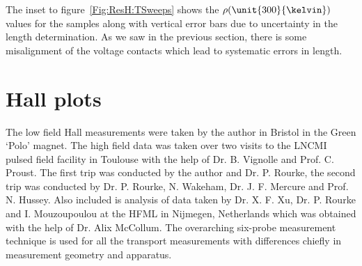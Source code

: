 The inset to figure~\ref{Fig:ResH:TSweeps} shows the $\rho(\unit{300}{\kelvin})$ values for the samples along with vertical error bars due to uncertainty in the length determination. As we saw in the previous section, there is some misalignment of the voltage contacts which lead to systematic errors in length.




\section{Hall plots}

The low field Hall measurements were taken by the author in Bristol in the Green `Polo' magnet. The high field data was taken over two visits to the \ac{LNCMI} pulsed field facility in Toulouse with the help of Dr. B. Vignolle and Prof. C. Proust. The first trip was conducted by the author and Dr. P. Rourke, the second trip was conducted by Dr. P. Rourke, N. Wakeham, Dr. J. F. Mercure and Prof. N. Hussey. Also included is analysis of data taken by Dr. X. F. Xu, Dr. P. Rourke and I. Mouzoupoulou at the \ac{HFML} in Nijmegen, Netherlands which was obtained with the help of Dr. Alix McCollum. The overarching six-probe measurement technique is used for all the transport measurements with differences chiefly in measurement geometry and apparatus.

